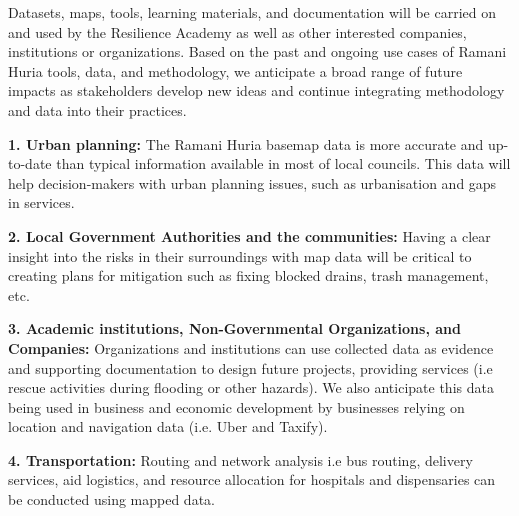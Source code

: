 \documentclass[a4paper,12pt,twoside]{article}
\begin{document}
\begin{multicols}{2}
Datasets, maps, tools, learning materials, and documentation will be carried on and used by the Resilience Academy as well as other interested companies, institutions or organizations. Based on the past and ongoing use cases of Ramani Huria tools, data, and methodology, we anticipate a broad range of future impacts as stakeholders develop new ideas and continue integrating methodology and data into their practices. 

    
\textbf{1. Urban planning:} The Ramani Huria basemap data is more accurate and up-to-date than typical information available in most of local councils. This data will help decision-makers with urban planning issues, such as urbanisation and gaps in services.

\textbf{2. Local Government Authorities and the communities:} Having a clear insight into the risks in their surroundings with map data will be critical  to creating plans for mitigation such as fixing blocked drains, trash management, etc.

\textbf{3. Academic institutions, Non-Governmental Organizations, and Companies:} Organizations and institutions can use collected data as evidence and supporting documentation to design future projects, providing services (i.e rescue activities during flooding or other hazards). We also anticipate this data being used in business and economic development by businesses relying on location and navigation data (i.e. Uber and Taxify).

\textbf{4. Transportation:} Routing and network analysis i.e bus routing, delivery services, aid logistics, and resource allocation for hospitals and dispensaries can be conducted using mapped data.
\end{multicols}


\newpage
\end{document}
